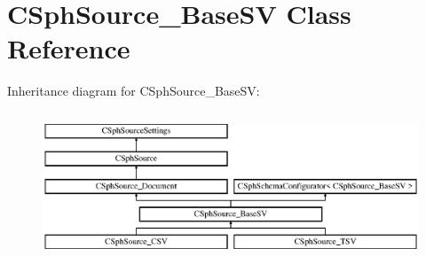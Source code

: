 \hypertarget{classCSphSource__BaseSV}{\section{C\-Sph\-Source\-\_\-\-Base\-S\-V Class Reference}
\label{classCSphSource__BaseSV}
}
Inheritance diagram for C\-Sph\-Source\-\_\-\-Base\-S\-V\-:\begin{figure}[H]
\begin{center}
\leavevmode
\includegraphics[height=4.444445cm]{classCSphSource__BaseSV}
\end{center}
\end{figure}

